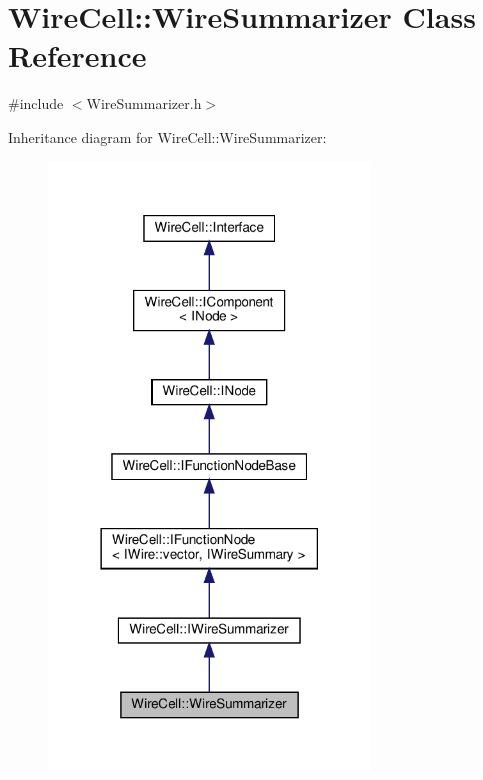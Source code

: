 \hypertarget{class_wire_cell_1_1_wire_summarizer}{}\section{Wire\+Cell\+:\+:Wire\+Summarizer Class Reference}
\label{class_wire_cell_1_1_wire_summarizer}


{\ttfamily \#include $<$Wire\+Summarizer.\+h$>$}



Inheritance diagram for Wire\+Cell\+:\+:Wire\+Summarizer\+:
\nopagebreak
\begin{figure}[H]
\begin{center}
\leavevmode
\includegraphics[width=242pt]{class_wire_cell_1_1_wire_summarizer__inherit__graph}
\end{center}
\end{figure}


